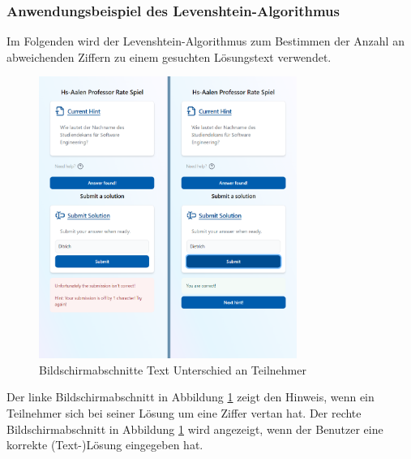 \subsubsection{Anwendungsbeispiel des Levenshtein-Algorithmus}

Im Folgenden wird der Levenshtein-Algorithmus zum Bestimmen der Anzahl an abweichenden Ziffern zu einem gesuchten Lösungstext verwendet.

\begin{figure}[H]
    \centering
    \includegraphics[width=0.75\textwidth]{images/PrAr_Impl_CharacterDiff-UI.png}
    \caption{Bildschirmabschnitte Text Unterschied an Teilnehmer}
    \label{fig:implementierung:characterdiff_ui}
\end{figure}

Der linke Bildschirmabschnitt in Abbildung \ref{fig:implementierung:characterdiff_ui} zeigt den Hinweis, wenn ein Teilnehmer sich bei seiner Lösung um eine Ziffer vertan hat. Der rechte Bildschirmabschnitt in Abbildung \ref{fig:implementierung:characterdiff_ui} wird angezeigt, wenn der Benutzer eine korrekte (Text-)Lösung eingegeben hat.

